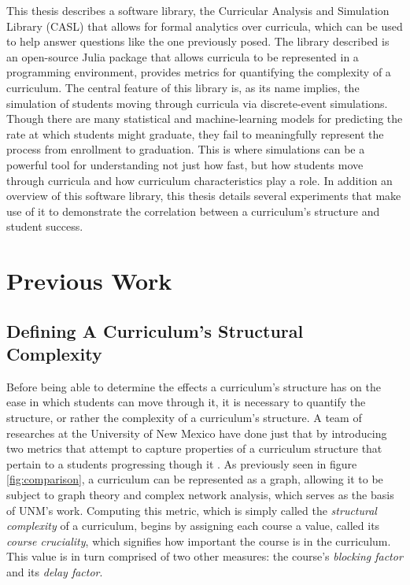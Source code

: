 \documentclass[botnum, fleqn]{unmeethesis}
\begin{document}
  This thesis describes a software library, the Curricular Analysis and Simulation Library (CASL) that allows for formal analytics over curricula, which can be used to help answer questions like the one previously posed. The library described is an open-source Julia package that allows curricula to be represented in a programming environment, provides metrics for quantifying the complexity of a curriculum. The central feature of this library is, as its name implies, the simulation of students moving through curricula via discrete-event simulations. Though there are many statistical and machine-learning models for predicting the rate at which students might graduate, they fail to meaningfully represent the process from enrollment to graduation. This is where simulations can be a powerful tool for understanding not just how fast, but how students move through curricula and how curriculum characteristics play a role. In addition an overview of this software library, this thesis details several experiments that make use of it to demonstrate the correlation between a curriculum's structure and student success.


\chapter{Previous Work}

  \section{Defining A Curriculum's Structural Complexity}
    Before being able to determine the effects a curriculum's structure has on the ease in which students can move through it, it is necessary to quantify the structure, or rather the complexity of a curriculum's structure. A team of researches at the University of New Mexico have done just that by introducing two metrics that attempt to capture properties of a curriculum structure that pertain to a students progressing though it \cite{complexity}. As previously seen in figure \ref{fig:comparison}, a curriculum can be represented as a graph, allowing it to be subject to graph theory and complex network analysis, which serves as the basis of UNM's work. Computing this metric, which is simply called the \textit{structural complexity} of a curriculum, begins by assigning each course a value, called its \textit{course cruciality}, which signifies how important the course is in the curriculum. This value is in turn comprised of two other measures: the course's \textit{blocking factor} and its \textit{delay factor}.
\end{document}
